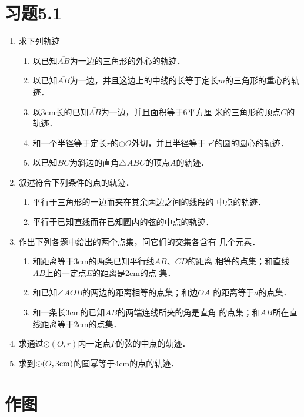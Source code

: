 \section*{习题5.1}
\begin{enumerate}
    \item 求下列轨迹
\begin{enumerate}
    \item 以已知$\overline{AB}$为一边的三角形的外心的轨迹．
    \item 以已知$\overline{AB}$为一边，并且这边上的中线的长等于定长$m$的三角形的重心的轨迹．
\item 以3cm长的已知$\overline{AB}$为一边，并且面积等于6平方厘
米的三角形的顶点$C$的轨迹．
\item 和一个半径等于定长$r$的$\odot O$外切，并且半径等于
$r'$的圆的圆心的轨迹．
\item 以已知$\overline{BC}$为斜边的直角$\triangle ABC$的顶点$A$的轨迹．
\end{enumerate}

\item 叙述符合下列条件的点的轨迹．
\begin{enumerate}
    \item 平行于三角形的一边而夹在其余两边之间的线段的
中点的轨迹．
\item 平行于已知直线而在已知圆内的弦的中点的轨迹．
\end{enumerate}
\item 作出下列各题中给出的两个点集，问它们的交集各含有
几个元素．

\begin{enumerate}
    \item 和距离等于3cm的两条已知平行线$AB$、$CD$的距离
相等的点集；和直线$AB$上的一定点$E$的距离是2cm的点
集．
\item 和已知$\angle AOB$的两边的距离相等的点集；和边$OA$
的距离等于$d$的点集．
\item 和一条长3cm的已知$\overline{AB}$的两端连线所夹的角是直角
的点集；和$\overline{AB}$所在直线距离等于2cm的点集．
\end{enumerate}


\item 求通过$\odot (O,r)$内一定点$P$的弦的中点的轨迹．
\item 求到$\odot(O,3{\rm cm})$的圆幂等于4cm的点的轨迹．
\end{enumerate}

\section{作图}
